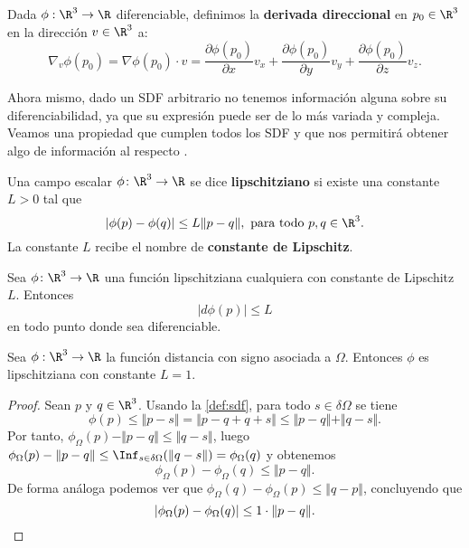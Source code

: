 \begin{definicion}
  Dada $\phi:\R^3\to \R$ diferenciable, definimos la \textbf{derivada direccional} en $p_0\in \R^3$ en la dirección $v\in\R^3$ a:
  \begin{equation*}
    \nabla_v \phi(p_0) = \nabla \phi(p_0) \cdot v = \frac{\partial{\phi}(p_0)}{\partial{x}}v_x + \frac{\partial{\phi}(p_0)}{\partial{y}}v_y + \frac{\partial{\phi}(p_0)}{\partial{z}}v_z.
  \end{equation*}
\end{definicion}




Ahora mismo, dado un SDF arbitrario no tenemos información alguna sobre su diferenciabilidad, ya que su expresión puede ser de lo más variada y compleja. Veamos una propiedad que cumplen todos los SDF y que nos permitirá obtener algo de información al respecto \cite{lips,derivWiki}.

\begin{definicion}
    Una campo escalar $\phi\colon \R^3 \to \R$ se dice \textbf{lipschitziano} si existe una constante $L>0$ tal que
    \begin{equation*}
        \vert \phi(p)-\phi(q)\vert \le L\Vert p-q\Vert,\ \text{para todo } p,q\in \R^3.
    \end{equation*}
    La constante $L$ recibe el nombre de \textbf{constante de Lipschitz}.
\end{definicion}

\begin{proposicion}
    Sea $\phi\colon \R^3 \to \R$ una función lipschitziana cualquiera con constante de Lipschitz $L$. Entonces
    \begin{equation*}
        \vert d\phi(p)\vert \le L
    \end{equation*}
    en todo punto donde sea diferenciable.
\end{proposicion}

\begin{lema}
    Sea $\phi:\R^3\to \R$ la función distancia con signo asociada a $\Omega$. Entonces $\phi$ es lipschitziana con constante $L=1$.
\end{lema}
\begin{proof}
    Sean $p$ y $q\in \R^3$. Usando la \autoref{def:sdf}, para todo $s\in \delta\Omega$ se tiene
    \begin{equation*}
        \phi(p) \le \Vert p-s\Vert = \Vert p-q+q+s\Vert \le \Vert p-q\Vert + \Vert q-s\Vert.
    \end{equation*}
    Por tanto, $\phi_{\Omega}(p) - \Vert p-q\Vert \le \Vert q-s \Vert$, luego $\phi_{\Omega}(p) - \Vert p-q\Vert \le \Inf_{s\in \delta\Omega}(\Vert q-s \Vert) = \phi_{\Omega}(q)$ y obtenemos
    \begin{equation*}
         \phi_{\Omega}(p) - \phi_{\Omega}(q) \le \Vert p-q \Vert.
    \end{equation*}
    De forma análoga podemos ver que $\phi_{\Omega}(q) - \phi_{\Omega}(p) \le \Vert q-p \Vert$, concluyendo que
    \begin{equation*}
        \vert \phi_{\Omega}(p) - \phi_{\Omega}(q)\vert \le 1\cdot \Vert p-q\Vert.\qedhere
    \end{equation*}
\end{proof}

